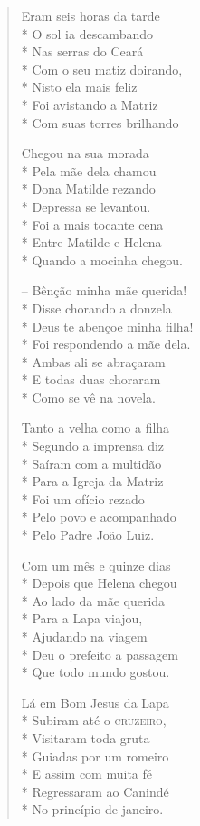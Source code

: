 \begin{verse}
Eram seis horas da tarde\\*
O sol ia descambando\\*
Nas serras do Ceará\\*
Com o seu matiz doirando,\\*
Nisto ela mais feliz\\*
Foi avistando a Matriz\\*
Com suas torres brilhando

Chegou na sua morada\\*
Pela mãe dela chamou\\*
Dona Matilde rezando\\*
Depressa se levantou.\\*
Foi a mais tocante cena\\*
Entre Matilde e Helena\\*
Quando a mocinha chegou.

-- Bênção minha mãe querida!\\*
Disse chorando a donzela\\*
Deus te abençoe minha filha!\\*
Foi respondendo a mãe dela.\\*
Ambas ali se abraçaram\\*
E todas duas choraram\\*
Como se vê na novela.

Tanto a velha como a filha\\*
Segundo a imprensa diz\\*
Saíram com a multidão\\*
Para a Igreja da Matriz\\*
Foi um ofício rezado\\*
Pelo povo e acompanhado\\*
Pelo Padre João Luiz.

Com um mês e quinze dias\\*
Depois que Helena chegou\\*
Ao lado da mãe querida\\*
Para a Lapa viajou,\\*
Ajudando na viagem\\*
Deu o prefeito a passagem\\*
Que todo mundo gostou.

Lá em Bom Jesus da Lapa\\*
Subiram até o \textsc{cruzeiro},\\*
Visitaram toda gruta\\*
Guiadas por um romeiro\\*
E assim com muita fé\\*
Regressaram ao Canindé\\*
No princípio de janeiro.


\end{verse}
